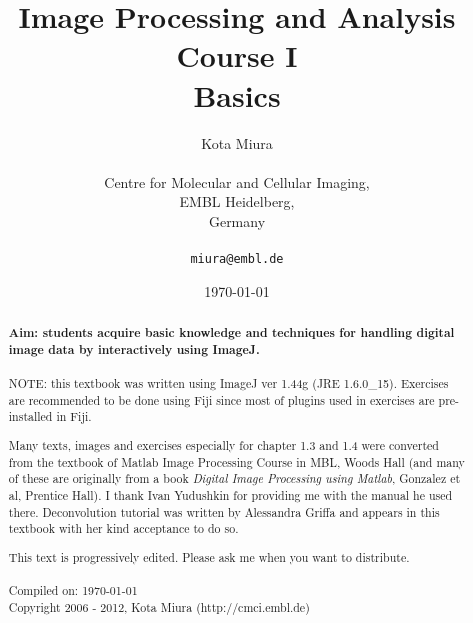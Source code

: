 \title{Image Processing and Analysis Course I\\
Basics}
\author{Kota Miura\\
\\
  Centre for Molecular and Cellular Imaging,\\
  EMBL Heidelberg,\\
  Germany\\
\\
\texttt{miura@embl.de}
}

\date{\today}

\pagestyle{empty}
\titleTH
\clearpage
\pagestyle{fancyplain}
\begin{abstract}
\HRule

\textbf{Aim: students acquire basic knowledge and techniques for handling
digital image data by interactively using ImageJ.} \\
\\

NOTE: this textbook was written using ImageJ ver 1.44g (JRE 1.6.0\_15).
Exercises are recommended to be done using Fiji since most of plugins used in
exercises are pre-installed in Fiji.

Many texts, images and exercises especially for chapter 1.3 and 1.4 were
converted from the textbook of Matlab Image Processing Course in MBL, Woods Hall
(and many of these are originally from a book \textit{Digital Image Processing
using Matlab}, Gonzalez et al, Prentice Hall). I thank Ivan Yudushkin for
providing me with the manual he used there.
Deconvolution tutorial was written by Alessandra Griffa and appears in this
textbook with her kind acceptance to do so.

This text is progressively edited. Please ask me when you want to distribute. \\
\\
Compiled on: \today \\
Copyright 2006 - 2012, Kota Miura (http://cmci.embl.de)

\HRule
\end{abstract}